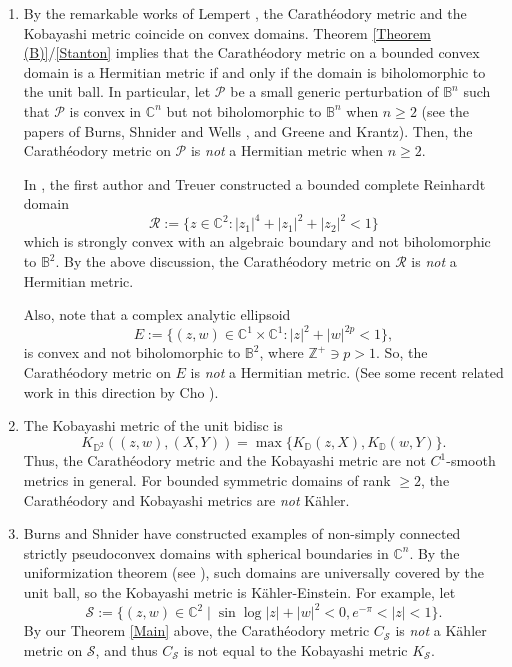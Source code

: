 \documentclass[12pt] {article}
\numberwithin{equation}{section}
\begin{document}

\begin{enumerate} 

\item [$(i)$] By the remarkable works of Lempert \cite{Lem, Lem81, Lem88}, the Carath\'eodory metric and the Kobayashi metric coincide on convex domains. Theorem \ref{Theorem (B)}/\ref{Stanton} implies that the Carath\'eodory metric on a bounded convex domain is a Hermitian metric if and only if the domain is biholomorphic to the unit ball. In particular, let $\mathcal{P}$ be a  small generic perturbation of $\mathbb{B}^n$ such that $\mathcal{P}$ is convex in $\mathbb{C}^n$ but not biholomorphic to $\mathbb{B}^n$ when $n \geq 2$ (see the papers of Burns, Shnider and Wells \cite{BSW1978}, and Greene and Krantz\cite{GK}). Then, the Carath\'eodory metric on $\mathcal{P}$ is \textit{not} a Hermitian metric when $n \geq 2$.

In \cite{DT}, the first author and Treuer constructed a bounded complete Reinhardt domain 
$$
\mathcal{R} := \{z \in \mathbb{C}^2 : |z_1|^4 + |z_1|^2 + |z_2|^2 < 1\}
$$
which is strongly convex with an algebraic boundary and not biholomorphic to $\mathbb{B}^2$. By the above discussion, the Carath\'eodory metric on $\mathcal{R}$ is \textit{not} a Hermitian metric.


Also, note that a complex analytic ellipsoid 
 $$
 {E}:=\{(z,w)\in {\mathbb{C}^1}\times{\mathbb{C}^1} : |z|^2+|w|^{2p}<1 \},$$
is convex and
not biholomorphic to $\mathbb{B}^2$,  where $\mathbb Z^+ \ni p>1$.
So,  the Carath\'eodory  metric on ${E}$
is  \textit{not} a Hermitian metric. 
(See some recent related work in this direction by Cho \cite{Cho}).

 

    \item [$(ii)$] The Kobayashi metric of the unit bidisc is 
$$
K_{\mathbb{D}^2} ((z, w), (X, Y)) = \max \{ K_{\mathbb{D}}(z, X), K_{\mathbb{D}}(w, Y) \}.
$$
Thus, the Carath\'eodory metric and the Kobayashi metric are not $C^1$-smooth metrics in general. For bounded symmetric domains of rank $\geq 2$, the Carath\'eodory and Kobayashi metrics are \textit{not} K\"ahler.

\item [$(iii)$] Burns and Shnider \cite{BS1976} have constructed examples of non-simply connected strictly pseudoconvex domains with spherical boundaries in $\mathbb{C}^n$. By the uniformization theorem (see \cite{NS1, NS2}), such domains are universally covered by the unit ball, so the Kobayashi metric is K\"ahler-Einstein. For example, let
$$
\mathcal{S} := \{(z, w) \in \mathbb{C}^2 \mid \sin \log|z| + |w|^2 < 0, e^{-\pi} < |z| < 1\}.
$$
By our Theorem \ref{Main} above, the Carath\'eodory metric $C_{\mathcal{S}}$ is \textit{not} a K\"ahler metric on $\mathcal{S}$, and thus $C_{\mathcal{S}}$ is not equal to the Kobayashi metric $K_{\mathcal{S}}$.
\end{enumerate}
\end{document}
